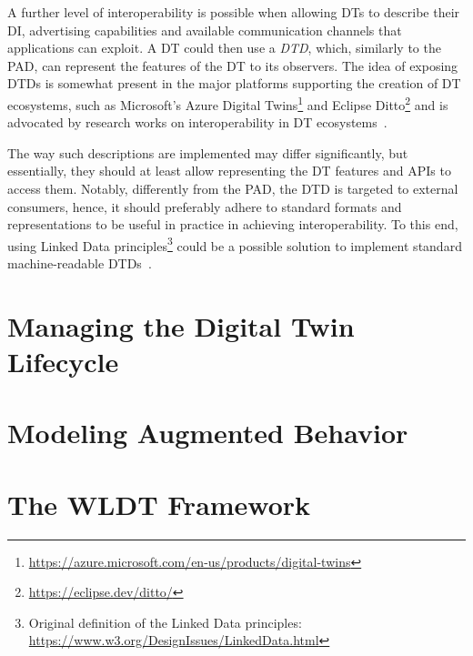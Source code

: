 A further level of interoperability is possible when allowing \acp{DT} to describe their \ac{DI}, advertising capabilities and available communication channels that applications can exploit.
%
%
A \ac{DT} could then use a \emph{\ac{DTD}}, which, similarly to the \ac{PAD}, can represent the features of the \ac{DT} to its observers.
%
The idea of exposing \acp{DTD} is somewhat present in the major platforms supporting the creation of \ac{DT} ecosystems, such as 
Microsoft's Azure Digital Twins\footnote{\url{https://azure.microsoft.com/en-us/products/digital-twins}} and Eclipse Ditto\footnote{\url{https://eclipse.dev/ditto/}} and is advocated by research works on interoperability in \ac{DT} ecosystems~\cite{etsi-dt-comm-requirements-2024,giulianelli2024models}.

The way such descriptions are implemented may differ significantly, but essentially, they should at least allow representing the \ac{DT}  features and APIs to access them.
%
Notably, differently from the \ac{PAD}, the \ac{DTD} is targeted to external consumers, hence, it should preferably adhere to standard formats and representations to be useful in practice in achieving interoperability.
%
To this end, using Linked Data principles\footnote{Original definition of the Linked Data principles: \url{https://www.w3.org/DesignIssues/LinkedData.html}} could be a possible solution to implement standard machine-readable \acp{DTD}~\cite{burattini2024models}.



\section{Managing the Digital Twin Lifecycle}

\section{Modeling Augmented Behavior}

\section{The \acl{WLDT} Framework}
